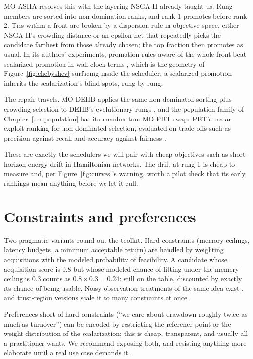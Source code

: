 MO-ASHA resolves this with the layering NSGA-II already taught us.
Rung members are sorted into non-domination ranks, and rank 1 promotes
before rank 2. Ties within a front are broken by a dispersion rule in
objective space, either NSGA-II's crowding distance or an epsilon-net
that repeatedly picks the candidate farthest from those already
chosen; the top fraction then promotes as usual. In its authors'
experiments, promotion rules aware of the whole front beat scalarized
promotion in wall-clock terms \citep{schmucker2021moasha}, which is
the geometry of Figure~\ref{fig:chebyshev} surfacing inside the
scheduler: a scalarized promotion inherits the scalarization's
blind spots, rung by rung.

The repair travels. MO-DEHB applies the same
non-dominated-sorting-plus-crowding selection to DEHB's evolutionary
rungs \citep{awad2023modehb}, and the population family of
Chapter~\ref{sec:population} has its member too: MO-PBT swaps PBT's
scalar exploit ranking for non-dominated selection, evaluated on
trade-offs such as precision against recall and accuracy against
fairness \citep{dushatskiy2023mopbt}.

These are exactly the schedulers we will pair with cheap objectives
such as short-horizon energy drift in Hamiltonian networks. The drift
at rung 1 is cheap to measure and, per Figure~\ref{fig:curves}'s
warning, worth a pilot check that its early rankings mean anything
before we let it cull.

\section{Constraints and preferences}

Two pragmatic variants round out the toolkit. Hard constraints (memory
ceilings, latency budgets, a minimum acceptable return) are handled by
weighting acquisitions with the modeled probability of feasibility. A
candidate whose acquisition score is $0.8$ but whose modeled chance of
fitting under the memory ceiling is $0.3$ counts as
$0.8 \times 0.3 = 0.24$: still on the table, discounted by exactly its
chance of being usable. Noisy-observation treatments of the same idea
exist \citep{letham2019noisyei}, and trust-region versions scale it to
many constraints at once \citep{eriksson2021scbo}.

Preferences short of hard
constraints (``we care about drawdown roughly twice as much as
turnover'') can be encoded by restricting the reference point or the
weight distribution of the scalarization; this is cheap, transparent,
and usually all a practitioner wants. We recommend exposing both, and
resisting anything more elaborate until a real use case demands it.

